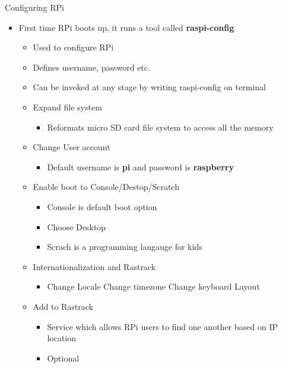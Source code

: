 \begin{frame}{Configuring RPi}
	\begin{itemize}
		\item First time RPi boots up, it runs a tool called \textbf{raspi-config}
		\begin{itemize}
			\item Used to configure RPi
			\item Defines username, password etc.
			\item Can be invoked at any stage by writing raspi-config on terminal
			\item Expand file system
			\begin{itemize}
				\item Reformats micro SD card file system to access all the memory
			\end{itemize}
			\item Change User account
			\begin{itemize}
				\item Default username is \textbf{pi} and password is \textbf{raspberry}
			\end{itemize}
			\item Enable boot to Console/Destop/Scratch
			\begin{itemize}
				\item Console is default boot option
				\item Choose Desktop
				\item Scrach is a programming langauge for kids
			\end{itemize}
			\item Internationalization and Rastrack
			\begin{itemize}
				\item Change Locale
				Change timezone
				Change keyboard Layout
			\end{itemize}
			\item Add to Rastrack
			\begin{itemize}
				\item Service which allows RPi users to find one another based on IP location
				\item Optional
			\end{itemize}
		\end{itemize}
	\end{itemize}
\end{frame}

